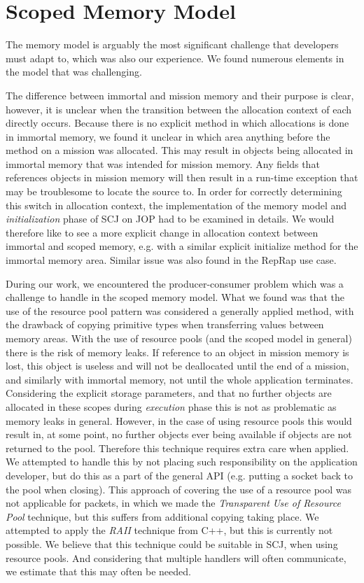 \section{Scoped Memory Model} %
 \label{sec:scoped_memory_model}
 The memory model is arguably the most significant challenge that developers must adapt to, which was also our experience. We found numerous elements in the model that was challenging.

 The difference between immortal and mission memory and their purpose is clear, however, it is unclear when the transition between the allocation context of each directly occurs. Because there is no explicit method in which allocations is done in immortal memory, we found it unclear in which area anything before the  method on a mission was allocated. This may result in objects being allocated in immortal memory that was intended for mission memory. Any fields that references objects in mission memory will then result in a run-time exception that may be troublesome to locate the source to. In order for correctly determining this switch in allocation context, the implementation of the memory model and \textit{initialization} phase of SCJ on JOP had to be examined in details. We would therefore like to see a more explicit change in allocation context between immortal and scoped memory, e.g. with a similar explicit initialize method for the immortal memory area. Similar issue was also found in the RepRap use case\cite{Schoeberl:2012:RepRap}.

During our work, we encountered the producer-consumer problem which was a challenge to handle in the scoped memory model. What we found was that the use of the resource pool pattern was considered a generally applied method, with the drawback of copying primitive types when transferring values between memory areas. With the use of resource pools (and the scoped model in general) there is the risk of memory leaks. If reference to an object in mission memory is lost, this object is useless and will not be deallocated until the end of a mission, and similarly with immortal memory, not until the whole application terminates. Considering the explicit storage parameters, and that no further objects are allocated in these scopes during \textit{execution} phase this is not as problematic as memory leaks in general. However, in the case of using resource pools this would result in, at some point, no further objects ever being available if objects are not returned to the pool. Therefore this technique requires extra care when applied. We attempted to handle this by not placing such responsibility on the application developer, but do this as a part of the general API (e.g. putting a socket back to the pool when closing). This approach of covering the use of a resource pool was not applicable for packets, in which we made the \textit{Transparent Use of Resource Pool} technique, but this suffers from additional copying taking place. We attempted to apply the \textit{RAII} technique from C++, but this is currently not possible. We believe that this technique could be suitable in SCJ, when using resource pools. And considering that multiple handlers will often communicate, we estimate that this may often be needed.

